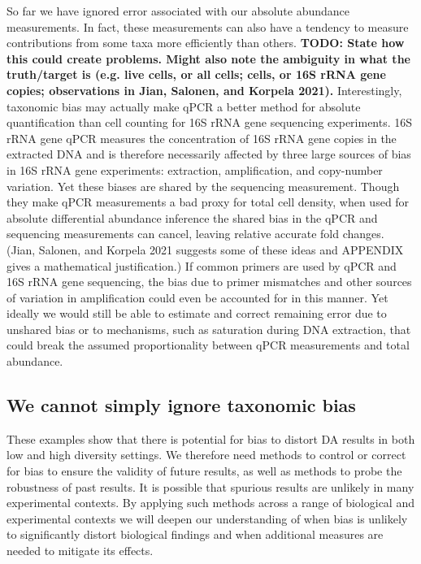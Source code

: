 \documentclass[
]{article}
\theoremstyle{definition}
\theoremstyle{definition}
\theoremstyle{definition}
\theoremstyle{definition}
\theoremstyle{remark}
\begin{document}
So far we have ignored error associated with our absolute abundance measurements.
In fact, these measurements can also have a tendency to measure contributions from some taxa more efficiently than others.
\textbf{TODO: State how this could create problems.
Might also note the ambiguity in what the truth/target is (e.g.
live cells, or all cells; cells, or 16S rRNA gene copies; observations in Jian, Salonen, and Korpela 2021).}
Interestingly, taxonomic bias may actually make qPCR a better method for absolute quantification than cell counting for 16S rRNA gene sequencing experiments.
16S rRNA gene qPCR measures the concentration of 16S rRNA gene copies in the extracted DNA and is therefore necessarily affected by three large sources of bias in 16S rRNA gene experiments: extraction, amplification, and copy-number variation.
Yet these biases are shared by the sequencing measurement.
Though they make qPCR measurements a bad proxy for total cell density, when used for absolute differential abundance inference the shared bias in the qPCR and sequencing measurements can cancel, leaving relative accurate fold changes.
(Jian, Salonen, and Korpela 2021 suggests some of these ideas and APPENDIX gives a mathematical justification.)
If common primers are used by qPCR and 16S rRNA gene sequencing, the bias due to primer mismatches and other sources of variation in amplification could even be accounted for in this manner.
Yet ideally we would still be able to estimate and correct remaining error due to unshared bias or to mechanisms, such as saturation during DNA extraction, that could break the assumed proportionality between qPCR measurements and total abundance.

\hypertarget{we-cannot-simply-ignore-taxonomic-bias}{%
\subsection{We cannot simply ignore taxonomic bias}\label{we-cannot-simply-ignore-taxonomic-bias}}

These examples show that there is potential for bias to distort DA results in both low and high diversity settings.
We therefore need methods to control or correct for bias to ensure the validity of future results, as well as methods to probe the robustness of past results.
It is possible that spurious results are unlikely in many experimental contexts.
By applying such methods across a range of biological and experimental contexts we will deepen our understanding of when bias is unlikely to significantly distort biological findings and when additional measures are needed to mitigate its effects.
\end{document}
